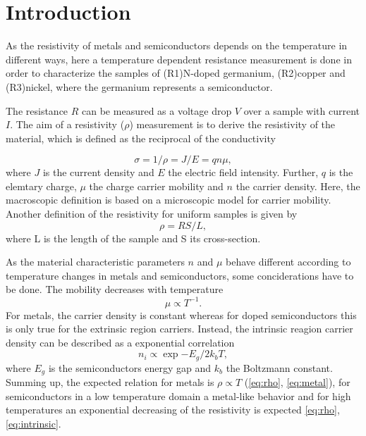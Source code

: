 



\section{Introduction}
\label{sec:Introduction}

As the resistivity of metals and semiconductors depends on the temperature in different ways,
here a temperature dependent resistance measurement is done in order to characterize the samples of 
(R1)N-doped germanium, (R2)copper and (R3)nickel, where the germanium represents a semiconductor.

The resistance $R$ can be measured as a voltage drop $V$ over a sample with current $I$.
The aim of a resistivity ($\rho$) measurement is to derive the resistivity of the material, which is defined as the reciprocal of the conductivity

\begin{equation}\label{eq:rho}
    \sigma = 1 / \rho = J / E = q n \mu,
\end{equation}
where $J$ is the current density and $E$ the electric field intensity.
Further, $q$ is the elemtary charge, $\mu$ the charge carrier mobility and $n$ the carrier density.
Here, the macroscopic definition is based on a microscopic model for carrier mobility.
Another definition of the resistivity for uniform samples is given by 
\begin{equation}
    \rho = R S / L,
\end{equation}
where L is the length of the sample and S its cross-section.

As the material characteristic parameters $n$ and $\mu$ behave different according to temperature changes in metals and semiconductors, some conciderations have to be done.
The mobility decreases with temperature 
\begin{equation}\label{eq:metal}
  \mu \propto T^{-1}.
\end{equation}
For metals, the carrier density is constant whereas for doped semiconductors this is only true for the extrinsic region carriers.
Instead, the intrinsic reagion carrier density can be described as a exponential correlation
\begin{equation}\label{eq:intrinsic}
  n_i \propto \exp{-E_g /2k_bT},
\end{equation}
where $E_g$ is the semiconductors energy gap and $k_b$ the Boltzmann constant.
Summing up, the expected relation for metals is $\rho \propto T$ (\ref{eq:rho}, \ref{eq:metal}), for semiconductors in a low temperature domain
a metal-like behavior and for high temperatures an exponential decreasing of the resistivity is expected \ref{eq:rho}, \ref{eq:intrinsic}.

